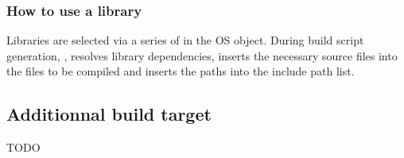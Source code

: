 \subsubsection{How to use a library}

Libraries are selected via a series of  in the OS object. During build script generation, \goil, resolves library dependencies, inserts the necessary source files into the files to be compiled and inserts the paths into the include path list.


\subsection{Additionnal build target}
\label{sec:additionnalTarget}
TODO
